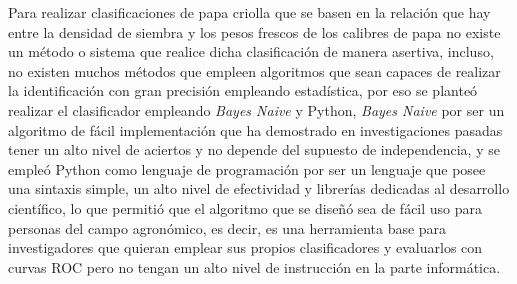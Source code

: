 Para realizar clasificaciones de papa criolla que se basen en la relación que hay entre
la densidad de siembra y los pesos frescos de los calibres de papa no existe un método
o sistema que realice dicha clasificación de manera asertiva, incluso, no existen muchos
métodos que empleen algoritmos que sean capaces de realizar la identificación con gran precisión
empleando estadística, por eso se planteó realizar el clasificador empleando
\textit{Bayes Naive} y Python, \textit{Bayes Naive} por ser un algoritmo de fácil
implementación que ha demostrado en investigaciones pasadas tener un alto nivel de
aciertos y no depende del supuesto de independencia, y se empleó Python como
lenguaje de programación por ser un lenguaje que posee una sintaxis simple, un alto
nivel de efectividad y librerías dedicadas al desarrollo científico, lo que permitió
que el algoritmo que se diseñó sea de fácil uso para personas del campo agronómico, es
decir, es una herramienta base para investigadores que quieran emplear sus
propios clasificadores y evaluarlos con curvas ROC pero no tengan un alto nivel de instrucción
en la parte informática.




